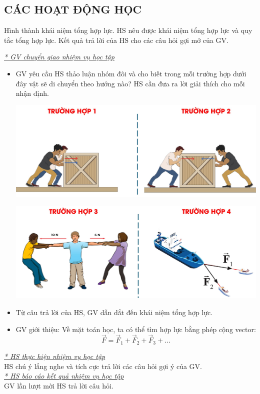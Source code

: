 \subsection{CÁC HOẠT ĐỘNG HỌC}
\hoatdong
{Hình thành khái niệm tổng hợp lực.
}
{HS nêu được khái niệm tổng hợp lực và quy tắc tổng hợp lực.
}
{Kết quả trả lời của HS cho các câu hỏi gợi mở của GV.
}
{\textit{\underline{* GV chuyển giao nhiệm vụ học tập}}
	\begin{itemize}[label=-]
		\item GV yêu cầu HS thảo luận nhóm đôi và cho biết trong mỗi trường hợp dưới đây vật sẽ di chuyển theo hướng nào? HS cần đưa ra lời giải thích cho mỗi nhận định.
		\begin{center}
			\includegraphics[scale=0.4]{figs/G10-BAI9-1}
		\end{center}
		\begin{center}
			\includegraphics[scale=0.4]{figs/G10-BAI9-2}
		\end{center}
		\item Từ câu trả lời của HS, GV dẫn dắt đến khái niệm tổng hợp lực.
		\item GV giới thiệu: Về mặt toán học, ta có thể tìm hợp lực bằng phép cộng vector: $$\vec{F}=\vec{F}_1+\vec{F}_2+\vec{F}_3+\dots$$
	\end{itemize}
		\textit{\underline{* HS thực hiện nhiệm vụ học tập}}\\
	HS chú ý lắng nghe và tích cực trả lời các câu hỏi gợi ý của GV.\\
	\textit{\underline{* HS báo cáo kết quả nhiệm vụ học tập}}\\
	GV lần lượt mời HS trả lời câu hỏi.
}
